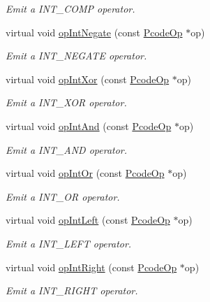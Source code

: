 \begin{DoxyCompactItemize}
\begin{DoxyCompactList}\small\item\em Emit a I\+N\+T\+\_\+C\+O\+MP operator. \end{DoxyCompactList}\item 
virtual void \mbox{\hyperlink{class_print_c_a24e90cef3b03bf46f437afc3d69dced9}{op\+Int\+Negate}} (const \mbox{\hyperlink{class_pcode_op}{Pcode\+Op}} $\ast$op)
\begin{DoxyCompactList}\small\item\em Emit a I\+N\+T\+\_\+\+N\+E\+G\+A\+TE operator. \end{DoxyCompactList}\item 
virtual void \mbox{\hyperlink{class_print_c_ada671bc89f1ea2d1d118cdd1e417fb98}{op\+Int\+Xor}} (const \mbox{\hyperlink{class_pcode_op}{Pcode\+Op}} $\ast$op)
\begin{DoxyCompactList}\small\item\em Emit a I\+N\+T\+\_\+\+X\+OR operator. \end{DoxyCompactList}\item 
virtual void \mbox{\hyperlink{class_print_c_a2d7c81981f07fd7164919ae0edf01799}{op\+Int\+And}} (const \mbox{\hyperlink{class_pcode_op}{Pcode\+Op}} $\ast$op)
\begin{DoxyCompactList}\small\item\em Emit a I\+N\+T\+\_\+\+A\+ND operator. \end{DoxyCompactList}\item 
virtual void \mbox{\hyperlink{class_print_c_af143418493c3e113a5f5c297ea03b17e}{op\+Int\+Or}} (const \mbox{\hyperlink{class_pcode_op}{Pcode\+Op}} $\ast$op)
\begin{DoxyCompactList}\small\item\em Emit a I\+N\+T\+\_\+\+OR operator. \end{DoxyCompactList}\item 
virtual void \mbox{\hyperlink{class_print_c_a130d01539058cdab8274bb10a2d5e74e}{op\+Int\+Left}} (const \mbox{\hyperlink{class_pcode_op}{Pcode\+Op}} $\ast$op)
\begin{DoxyCompactList}\small\item\em Emit a I\+N\+T\+\_\+\+L\+E\+FT operator. \end{DoxyCompactList}\item 
virtual void \mbox{\hyperlink{class_print_c_a5bde1e28e184cb9b0c4b0e8db7862bf0}{op\+Int\+Right}} (const \mbox{\hyperlink{class_pcode_op}{Pcode\+Op}} $\ast$op)
\begin{DoxyCompactList}\small\item\em Emit a I\+N\+T\+\_\+\+R\+I\+G\+HT operator. \end{DoxyCompactList}\item 

\end{DoxyCompactItemize}
